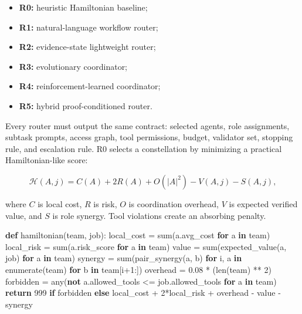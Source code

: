 \documentclass[
  11pt,
]{article}
\newenvironment{Shaded}{}{}
\newcommand{\BuiltInTok}[1]{\textcolor[rgb]{0.00,0.50,0.00}{#1}}
\newcommand{\ControlFlowTok}[1]{\textcolor[rgb]{0.00,0.44,0.13}{\textbf{#1}}}
\newcommand{\DecValTok}[1]{\textcolor[rgb]{0.25,0.63,0.44}{#1}}
\newcommand{\FloatTok}[1]{\textcolor[rgb]{0.25,0.63,0.44}{#1}}
\newcommand{\KeywordTok}[1]{\textcolor[rgb]{0.00,0.44,0.13}{\textbf{#1}}}
\newcommand{\NormalTok}[1]{#1}
\newcommand{\OperatorTok}[1]{\textcolor[rgb]{0.40,0.40,0.40}{#1}}
\providecommand{\tightlist}{%
  \setlength{\itemsep}{0pt}\setlength{\parskip}{0pt}}
\begin{document}
\begin{itemize}
\tightlist
\item
  \textbf{R0:} heuristic Hamiltonian baseline;
\item
  \textbf{R1:} natural-language workflow router;
\item
  \textbf{R2:} evidence-state lightweight router;
\item
  \textbf{R3:} evolutionary coordinator;
\item
  \textbf{R4:} reinforcement-learned coordinator;
\item
  \textbf{R5:} hybrid proof-conditioned router.
\end{itemize}

Every router must output the same contract: selected agents, role
assignments, subtask prompts, access graph, tool permissions, budget,
validator set, stopping rule, and escalation rule. R0 selects a
constellation by minimizing a practical Hamiltonian-like score:

\[
\mathcal{H}(A,j)
=
C(A)+2R(A)+O(|A|^2)-V(A,j)-S(A,j),
\]

where \(C\) is local cost, \(R\) is risk, \(O\) is coordination
overhead, \(V\) is expected verified value, and \(S\) is role synergy.
Tool violations create an absorbing penalty.

\begin{Shaded}
\begin{Highlighting}[]
\KeywordTok{def}\NormalTok{ hamiltonian(team, job):}
\NormalTok{    local\_cost }\OperatorTok{=} \BuiltInTok{sum}\NormalTok{(a.avg\_cost }\ControlFlowTok{for}\NormalTok{ a }\KeywordTok{in}\NormalTok{ team)}
\NormalTok{    local\_risk }\OperatorTok{=} \BuiltInTok{sum}\NormalTok{(a.risk\_score }\ControlFlowTok{for}\NormalTok{ a }\KeywordTok{in}\NormalTok{ team)}
\NormalTok{    value }\OperatorTok{=} \BuiltInTok{sum}\NormalTok{(expected\_value(a, job) }\ControlFlowTok{for}\NormalTok{ a }\KeywordTok{in}\NormalTok{ team)}
\NormalTok{    synergy }\OperatorTok{=} \BuiltInTok{sum}\NormalTok{(pair\_synergy(a, b) }\ControlFlowTok{for}\NormalTok{ i, a }\KeywordTok{in} \BuiltInTok{enumerate}\NormalTok{(team) }\ControlFlowTok{for}\NormalTok{ b }\KeywordTok{in}\NormalTok{ team[i}\OperatorTok{+}\DecValTok{1}\NormalTok{:])}
\NormalTok{    overhead }\OperatorTok{=} \FloatTok{0.08} \OperatorTok{*}\NormalTok{ (}\BuiltInTok{len}\NormalTok{(team) }\OperatorTok{**} \DecValTok{2}\NormalTok{)}
\NormalTok{    forbidden }\OperatorTok{=} \BuiltInTok{any}\NormalTok{(}\KeywordTok{not}\NormalTok{ a.allowed\_tools }\OperatorTok{\textless{}=}\NormalTok{ job.allowed\_tools }\ControlFlowTok{for}\NormalTok{ a }\KeywordTok{in}\NormalTok{ team)}
    \ControlFlowTok{return} \DecValTok{999} \ControlFlowTok{if}\NormalTok{ forbidden }\ControlFlowTok{else}\NormalTok{ local\_cost }\OperatorTok{+} \DecValTok{2}\OperatorTok{*}\NormalTok{local\_risk }\OperatorTok{+}\NormalTok{ overhead }\OperatorTok{{-}}\NormalTok{ value }\OperatorTok{{-}}\NormalTok{ synergy}
\end{Highlighting}
\end{Shaded}
\end{document}
